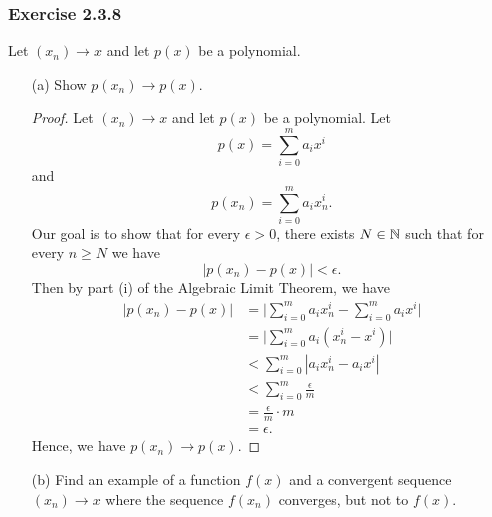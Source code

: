 \subsubsection{Exercise 2.3.8}
Let \( (x_n) \to x \) and let \( p(x)\) be a polynomial.
\begin{enumerate}
    \item[(a)] Show \( p(x_n) \to p(x)\).
        \begin{proof}
            Let \( (x_n) \to x \) and let \( p(x)\) be a polynomial. Let 
            \[ p(x) = \sum_{i=0}^{m} a_i x^i\]
            and 
            \[ p(x_n) = \sum_{i=0}^{m} a_i x_n^{i}. \]
            Our goal is to show that for every \( \epsilon > 0\), there exists \( N \in \mathbb{N} \) such that for every \( n \geq N \)            we have 
            \[ | p(x_n) - p(x)| < \epsilon.\]
           Then by part (i) of the Algebraic Limit Theorem, we have
           \begin{align*}
            | p(x_n) - p(x) |  &= \Big| \sum_{i=0}^{m} a_i x_n^{i} - \sum_{i=0}^{ m} a_i x^{i}  \Big| \\
                               &= \Big| \sum_{i=0}^{m} a_i (x^i_n - x^i)  \Big| \\
                               &<  \sum_{ i = 0}^{ m} | a_ix^i_n - a_ix^i | \tag{T.I}\\     
                               &<  \sum_{i=0}^{m} \frac{ \epsilon }{ m}  \tag{\(x_n \to x\)} \\
                               &= \frac{ \epsilon }{m }  \cdot m \\ 
                               &= \epsilon. 
           \end{align*}
           Hence, we have \( p(x_n) \to p(x)\).

        \end{proof}
    \item[(b)] Find an example of a function \( f(x)\) and a convergent sequence \( (x_n) \to x\) where the sequence \( f(x_n)\) converges, but not to \( f(x)\).
        
\end{enumerate}

